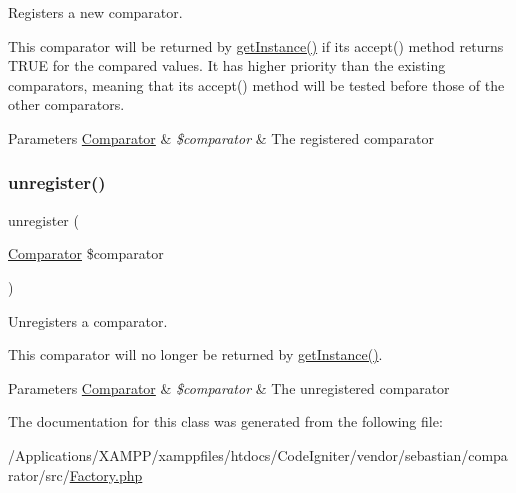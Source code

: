 Registers a new comparator.

This comparator will be returned by \mbox{\hyperlink{class_sebastian_bergmann_1_1_comparator_1_1_factory_ac93fbec81f07e5d15f80db907e63dc10}{get\+Instance()}} if its accept() method returns T\+R\+UE for the compared values. It has higher priority than the existing comparators, meaning that its accept() method will be tested before those of the other comparators.


\begin{DoxyParams}[1]{Parameters}
\mbox{\hyperlink{class_sebastian_bergmann_1_1_comparator_1_1_comparator}{Comparator}} & {\em \$comparator} & The registered comparator \\
\hline
\end{DoxyParams}
\mbox{\label{class_sebastian_bergmann_1_1_comparator_1_1_factory_a52e6511e6a6737ca95bc42fa9ff0f07e}} 
\subsubsection{\texorpdfstring{unregister()}{unregister()}}
{\footnotesize\ttfamily unregister (\begin{DoxyParamCaption}\item[{\mbox{\hyperlink{class_sebastian_bergmann_1_1_comparator_1_1_comparator}{Comparator}}}]{\$comparator }\end{DoxyParamCaption})}

Unregisters a comparator.

This comparator will no longer be returned by \mbox{\hyperlink{class_sebastian_bergmann_1_1_comparator_1_1_factory_ac93fbec81f07e5d15f80db907e63dc10}{get\+Instance()}}.


\begin{DoxyParams}[1]{Parameters}
\mbox{\hyperlink{class_sebastian_bergmann_1_1_comparator_1_1_comparator}{Comparator}} & {\em \$comparator} & The unregistered comparator \\
\hline
\end{DoxyParams}


The documentation for this class was generated from the following file\+:\begin{DoxyCompactItemize}
\item 
/\+Applications/\+X\+A\+M\+P\+P/xamppfiles/htdocs/\+Code\+Igniter/vendor/sebastian/comparator/src/\mbox{\hyperlink{sebastian_2comparator_2src_2_factory_8php}{Factory.\+php}}\end{DoxyCompactItemize}
